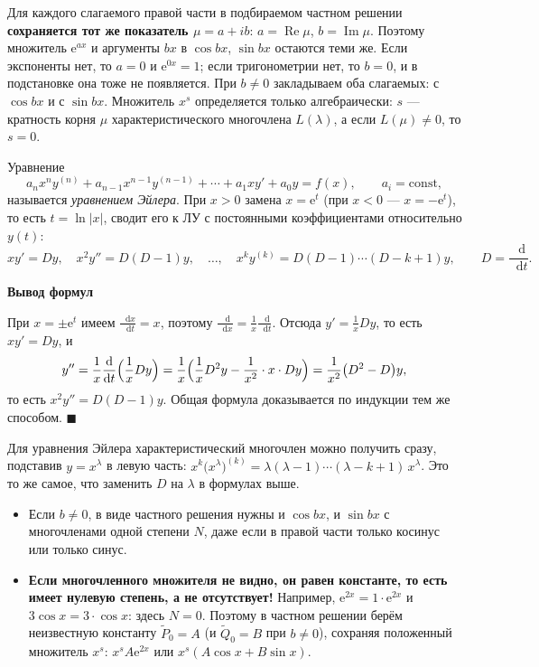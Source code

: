 \documentclass[12pt,a4paper]{article}
\numberwithin{equation}{section}
\renewcommand{\Re}{\operatorname{Re}}
\renewcommand{\Im}{\operatorname{Im}}
\newcommand{\e}{\mathrm{e}}
\newcommand{\dd}{\mathop{}\!\mathrm{d}}
\renewenvironment{proof}[1][Доказательство]{\begin{center}\textbf{#1}\end{center}}{\hfill$\blacksquare$\par}
\begin{document}
\begin{remarkHSE}
Для каждого слагаемого правой части в подбираемом частном решении \textbf{сохраняется тот же показатель \(\mu=a+ib\)}: \(a=\Re\mu\), \(b=\Im\mu\). Поэтому множитель \(\e^{ax}\) и аргументы \(bx\) в \(\cos bx\), \(\sin bx\) остаются теми же. Если экспоненты нет, то \(a=0\) и \(\e^{0x}=1\); если тригонометрии нет, то \(b=0\), и в подстановке она тоже не появляется. При \(b\neq0\) закладываем оба слагаемых: с \(\cos bx\) и с \(\sin bx\). Множитель \(x^s\) определяется только алгебраически: \(s\) --- кратность корня \(\mu\) характеристического многочлена \(L(\lambda)\), а если \(L(\mu)\neq0\), то \(s=0\).
\end{remarkHSE}

\label{box:euler}
\begin{definitionHSE}
Уравнение
\[
a_nx^ny^{(n)}+a_{n-1}x^{n-1}y^{(n-1)}+\cdots+a_1xy'+a_0y=f(x),\qquad a_i=\mathrm{const},
\]
называется \textit{уравнением Эйлера}. При \(x>0\) замена \(x=\e^t\) (при \(x<0\) --- \(x=-\e^t\)), то есть \(t=\ln|x|\), сводит его к ЛУ с постоянными коэффициентами относительно \(y(t)\):
\[
xy'=Dy,\quad x^2y''=D(D-1)y,\quad\ldots,\quad x^ky^{(k)}=D(D-1)\cdots(D-k+1)y,\qquad D=\frac{\dd}{\dd t}.
\]
\end{definitionHSE}

\begin{proof}[Вывод формул]
При \(x=\pm\e^t\) имеем \(\frac{\dd x}{\dd t}=x\), поэтому \(\frac{\dd}{\dd x}=\frac1x\frac{\dd}{\dd t}\). Отсюда \(y'=\frac1xDy\), то есть \(xy'=Dy\), и
\[
y''=\frac1x\frac{\dd}{\dd t}\Bigl(\frac1xDy\Bigr)=\frac1x\Bigl(\frac1xD^2y-\frac1{x^2}\cdot x\cdot Dy\Bigr)=\frac1{x^2}\bigl(D^2-D\bigr)y,
\]
то есть \(x^2y''=D(D-1)y\). Общая формула доказывается по индукции тем же способом.
\end{proof}

\begin{remarkHSE}
Для уравнения Эйлера характеристический многочлен можно получить сразу, подставив \(y=x^\lambda\) в левую часть: \(x^k\bigl(x^\lambda\bigr)^{(k)}=\lambda(\lambda-1)\cdots(\lambda-k+1)\,x^\lambda\). Это то же самое, что заменить \(D\) на \(\lambda\) в формулах выше.
\end{remarkHSE}

\begin{remarkHSE}
\begin{itemize}
\item Если \(b\neq0\), в виде частного решения нужны и \(\cos bx\), и \(\sin bx\) с многочленами одной степени \(N\), даже если в правой части только косинус или только синус.
\item \textbf{Если многочленного множителя не видно, он равен константе, то есть имеет нулевую степень, а не отсутствует!} Например, \(\e^{2x}=1\cdot\e^{2x}\) и \(3\cos x=3\cdot\cos x\): здесь \(N=0\). Поэтому в частном решении берём неизвестную константу \(\tilde P_0=A\) (и \(\tilde Q_0=B\) при \(b\neq0\)), сохраняя положенный множитель \(x^s\): \(x^s A\e^{2x}\) или \(x^s(A\cos x+B\sin x)\).
\end{itemize}
\end{remarkHSE}
\end{document}
